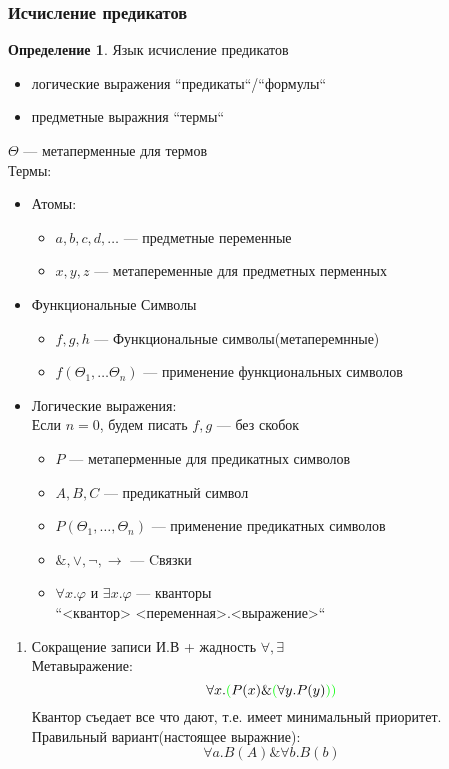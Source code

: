\documentclass[english]{article}
\theoremstyle{plain}
\theoremstyle{remark}
\theoremstyle{definition}
\newtheorem*{definition}{Определение}
\begin{document}
\subsubsection{Исчисление предикатов}
\label{sec:orgcbde718}
\begin{definition}
Язык исчисление предикатов
\begin{itemize}
\item логические выражения ``предикаты``/``формулы``
\item предметные выражния ``термы``
\end{itemize}
\(\Theta\) --- метаперменные для термов \\
Термы:
\begin{itemize}
\item Атомы:
\begin{itemize}
\item \(a, b, c, d, \dots\) --- предметные переменные
\item \(x, y, z\) --- метапеременные для предметных перменных
\end{itemize}
\item Функциональные Символы
\begin{itemize}
\item \(f, g, h\) --- Функциональные символы(метаперемнные)
\item \(f(\Theta_1, \dots \Theta_n)\) --- применение функциональных символов
\end{itemize}
\item Логические выражения: \\
\color{gray}Если \(n = 0\), будем писать \(f, g\) --- без скобок\color{black}
\begin{itemize}
\item \(P\) --- метаперменные для предикатных символов
\item \(A, B, C\) --- предикатный символ
\item \(P(\Theta_1, \dots, \Theta_n)\) --- применение предикатных символов
\item \(\&, \vee, \neg, \to\) --- Cвязки
\item \(\forall x.\varphi\) и \(\exists x.\varphi\) --- кванторы \\
\color{gray}``<квантор> <переменная>.<выражение>``\color{black} \\
\end{itemize}
\end{itemize}
\end{definition}
\begin{enumerate}
\item Сокращение записи
\label{sec:org95b7a72}
И.В + жадность \(\forall, \exists\) \\
Метавыражение:
\[ \forall x. \color{green}(\color{black}P(x) \& \color{green}(\color{black}\forall y. P(y) \color{green}))\color{black} \]
Квантор съедает все что дают, т.е. имеет минимальный приоритет. \\
Правильный вариант(настоящее выражние):
\[ \forall a. B(A) \& \forall b. B(b) \]
\end{enumerate}
\end{document}
